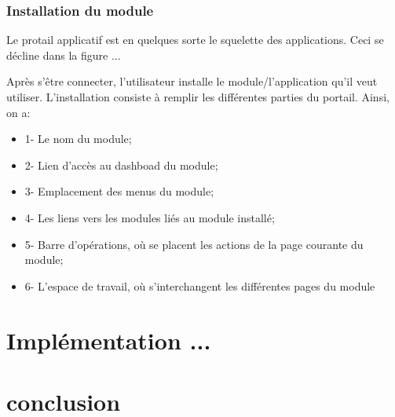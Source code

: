 \documentclass[a4paper,12pt]{article}
\begin{document}
\subsubsection{Installation du module}
Le protail applicatif est en quelques sorte le squelette des
applications. Ceci se décline dans la figure ...

Après s'être connecter, l'utilisateur installe le module/l'application 
qu'il veut utiliser. L'installation consiste à remplir les différentes
parties du portail. Ainsi, on a:

\begin{itemize}
\item 1- Le nom du module;
\item 2- Lien d'accès au dashboad du module;
\item 3- Emplacement des menus du module;
\item 4- Les liens vers les modules liés au module installé;
\item 5- Barre d'opérations, où se placent les actions de la page
  courante du module;
\item 6- L'espace de travail, où s'interchangent les différentes pages
  du module
\end{itemize}

\section{Implémentation ...}
\section{conclusion}
\end{document}
